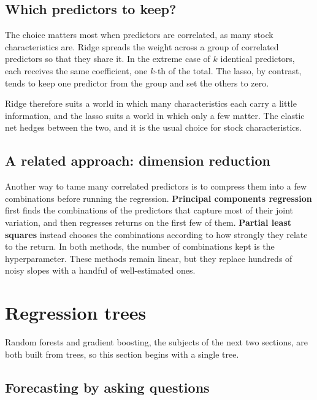 \subsection{Which predictors to keep?}

The choice matters most when predictors are correlated, as many stock characteristics are. Ridge spreads the weight across a group of correlated predictors so that they share it. In the extreme case of $k$ identical predictors, each receives the same coefficient, one $k$-th of the total. The lasso, by contrast, tends to keep one predictor from the group and set the others to zero.

Ridge therefore suits a world in which many characteristics each carry a little information, and the lasso suits a world in which only a few matter. The elastic net hedges between the two, and it is the usual choice for stock characteristics.

\subsection{A related approach: dimension reduction}

Another way to tame many correlated predictors is to compress them into a few combinations before running the regression. \textbf{Principal components regression} first finds the combinations of the predictors that capture most of their joint variation, and then regresses returns on the first few of them. \textbf{Partial least squares} instead chooses the combinations according to how strongly they relate to the return. In both methods, the number of combinations kept is the hyperparameter. These methods remain linear, but they replace hundreds of noisy slopes with a handful of well-estimated ones.

\section{Regression trees}
\label{sec:20-trees}

Random forests and gradient boosting, the subjects of the next two sections, are both built from trees, so this section begins with a single tree.

\subsection{Forecasting by asking questions}

